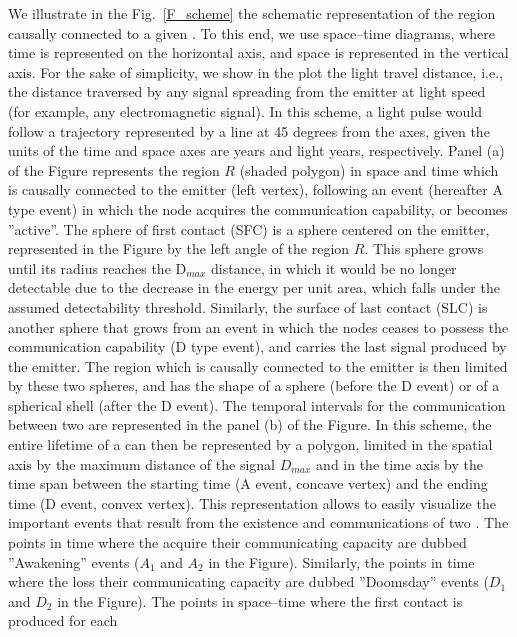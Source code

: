  We illustrate in the Fig.~\ref{F_scheme} the schematic
representation of the region causally connected to a given \ceti{}.
%
To this end, we use space--time diagrams, where time is represented on
the horizontal axis, and space is represented in the vertical axis.
%
For the sake of simplicity, we show in the plot the light travel
distance, i.e., the distance traversed by any signal spreading from
the emitter at light speed (for example, any electromagnetic signal).
%
In this scheme, a light pulse would follow a trajectory represented by
a line at 45 degrees from the axes, given the units of the time and
space axes are years and light years, respectively.
%
Panel (a) of the Figure represents the region $R$ (shaded polygon) in
space and time which is causally connected to the emitter (left
vertex), following an event (hereafter A type event) in which the node
acquires the communication capability, or becomes ''active''.
%
The sphere of first contact (SFC) is a sphere centered on the emitter,
represented in the Figure by the left angle of the region $R$.
%
This sphere grows until its radius reaches the D$_{max}$ distance, in
which it would be no longer detectable due to the decrease in the
energy per unit area, which falls under the assumed detectability
threshold.
%
Similarly, the surface of last contact (SLC) is another sphere that
grows from an event in which the nodes ceases to possess the
communication capability (D type event), and carries the last signal
produced by the emitter.
%
The region which is causally connected to the emitter is then limited
by these two spheres, and has the shape of a sphere (before the D
event) or of a spherical shell (after the D event).
%
The temporal intervals for the communication between two \cetis{} are
represented in the panel (b) of the Figure.
%
In this scheme, the entire lifetime of a \ceti{} can then be
represented by a polygon, limited in the spatial axis by the maximum
distance of the signal $D_{max}$ and in the time axis by the time span
between the starting time (A event, concave vertex) and the ending
time (D event, convex vertex).
%
This representation allows to easily visualize the important events
that result from the existence and communications of two \cetis{}.
%
The points in time where the \cetis{} acquire their communicating
capacity are dubbed ''Awakening'' events ($A_1$ and $A_2$ in the
Figure).
%
Similarly, the points in time where the \cetis{} loss their
communicating capacity are dubbed ''Doomsday'' events ($D_1$ and $D_2$
in the Figure).
%
The points in space--time where the first contact is produced for each
